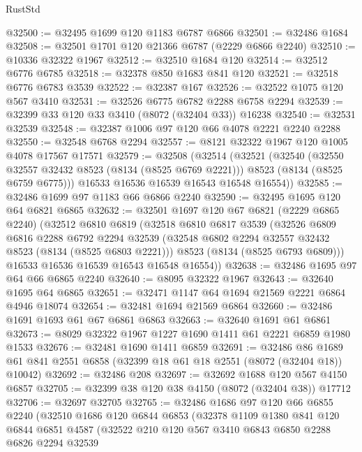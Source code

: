 \begin{lexlean}{RustStd}
\begin{coremodule}
@32500 := @32495 @1699 @120 @1183 @6787 @6866
@32501 := @32486 @1684
@32508 := @32501 @1701 @120 @21366 @6787 (@2229 @6866 @2240)
@32510 := @10336 @32322 @1967
@32512 := @32510 @1684 @120
@32514 := @32512 @6776 @6785
@32518 := @32378 @850 @1683 @841 @120
@32521 := @32518 @6776 @6783 @3539
@32522 := @32387 @167
@32526 := @32522 @1075 @120 @567 @3410
@32531 := @32526 @6775 @6782 @2288 @6758 @2294
@32539 := @32399 @33 @120 @33 @3410 (@8072 (@32404 @33)) @16238
@32540 := @32531 @32539
@32548 := @32387 @1006 @97 @120 @66 @4078 @2221 @2240 @2288
@32550 := @32548 @6768 @2294
@32557 := @8121 @32322 @1967 @120 @1005 @4078 @17567 @17571
@32579 := @32508
    (@32514
      (@32521
        (@32540
          (@32550 @32557 @32432 @8523 (@8134 (@8525 @6769 @2221)))
          @8523
          (@8134 (@8525 @6759 @6775)))
        @16533
        @16536
        @16539
        @16543
        @16548
        @16554))
@32585 := @32486 @1699 @97 @1183 @66 @6866 @2240
@32590 := @32495 @1695 @120 @64 @6821 @6865
@32632 := @32501
    @1697
    @120
    @67
    @6821
    (@2229 @6865 @2240)
    (@32512
      @6810
      @6819
      (@32518
        @6810
        @6817
        @3539
        (@32526
          @6809
          @6816
          @2288
          @6792
          @2294
          @32539
          (@32548 @6802 @2294 @32557 @32432 @8523 (@8134 (@8525 @6803 @2221)))
          @8523
          (@8134 (@8525 @6793 @6809)))
        @16533
        @16536
        @16539
        @16543
        @16548
        @16554))
@32638 := @32486 @1695 @97 @64 @66 @6865 @2240
@32640 := @8095 @32322 @1967
@32643 := @32640 @1695 @64 @6865
@32651 := @32471 @1147 @64 @1694 @21569 @2221 @6864 @4946 @18074
@32654 := @32481 @1694 @21569 @6864
@32660 := @32486 @1691 @1693 @61 @67 @6861 @6863
@32663 := @32640 @1691 @61 @6861
@32673 := @8029 @32322 @1967 @1227 @1690 @1411 @61 @2221 @6859 @1980 @1533
@32676 := @32481 @1690 @1411 @6859
@32691 := @32486
    @86
    @1689
    @61
    @841
    @2551
    @6858
    (@32399 @18 @61 @18 @2551 (@8072 (@32404 @18)) @10042)
@32692 := @32486 @208
@32697 := @32692 @1688 @120 @567 @4150 @6857
@32705 := @32399 @38 @120 @38 @4150 (@8072 (@32404 @38)) @17712
@32706 := @32697 @32705
@32765 := @32486
    @1686
    @97
    @120
    @66
    @6855
    @2240
    (@32510
      @1686
      @120
      @6844
      @6853
      (@32378
        @1109
        @1380
        @841
        @120
        @6844
        @6851
        @4587
        (@32522
          @210
          @120
          @567
          @3410
          @6843
          @6850
          @2288
          @6826
          @2294
          @32539

\end{coremodule}
\end{lexlean}
